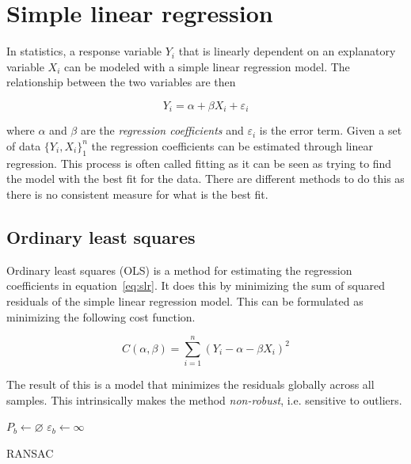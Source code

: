 \documentclass[a4paper]{report}
\begin{document}
\section{Simple linear regression}
In statistics, a response variable $Y_i$ that is linearly dependent on an
explanatory variable $X_i$ can be modeled with a simple linear regression
model. The relationship between the two variables are then

\begin{equation}
    Y_i = \alpha + \beta X_i + \varepsilon_i
    \label{eq:slr}
\end{equation}

where $\alpha$ and $\beta$ are the \emph{regression coefficients} and
$\varepsilon_i$ is the error term. Given a set of data
$\displaystyle \{Y_i, X_i\}_1^n$ the regression coefficients can be estimated
through linear regression. This process is often called fitting as it can be
seen as trying to find the model with the best fit for the data. There are
different methods to do this as there is no consistent measure for what is the
best fit.

\subsection{Ordinary least squares}
Ordinary least squares (OLS) is a method for estimating the regression
coefficients in equation~\ref{eq:slr}. It does this by minimizing the sum of
squared residuals of the simple linear regression model. This can be formulated
as minimizing the following cost function.

\begin{equation}
    C(\alpha, \beta) = \sum_{i=1}^n(Y_i - \alpha - \beta X_i)^2
\end{equation}

The result of this is a model that minimizes the residuals globally across all
samples. This intrinsically makes the method \emph{non-robust}, i.e. sensitive
to outliers.

{
    \fontsize{10}{12}
    \selectfont
    \begin{algorithm}[t]
        \DontPrintSemicolon
        \BlankLine
        \BlankLine
        $P_b \gets \varnothing$\;
        $\varepsilon_b \gets \infty$\;
        \BlankLine
        \caption{RANSAC}
        \label{alg:ransac}
    \end{algorithm}
}
\end{document}
